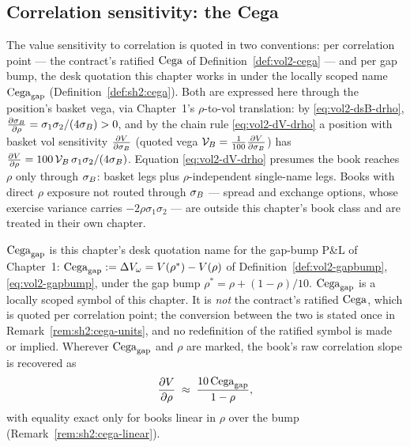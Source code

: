 \subsection{Correlation sensitivity: the Cega}\label{sec:sh2:cega}

The value sensitivity to correlation is quoted in two conventions: per
correlation point --- the contract's ratified $\mathrm{Cega}$ of
Definition~\ref{def:vol2-cega} --- and per gap bump, the desk quotation
this chapter works in under the locally scoped name $\mathrm{Cega}_{\mathrm{gap}}$
(Definition~\ref{def:sh2:cega}). Both are expressed here through the
position's basket vega, via Chapter~1's $\rho$-to-vol translation: by
\eqref{eq:vol2-dsB-drho}, $\frac{\partial \sigma_B}{\partial \rho} = \sigma_1\sigma_2/(4\sigma_B) > 0$,
and by the chain rule \eqref{eq:vol2-dV-drho} a position with basket vol
sensitivity $\frac{\partial V}{\partial \sigma_B}$ (quoted vega $\mathcal{V}_B = \tfrac1{100}\frac{\partial V}{\partial \sigma_B}$)
has $\frac{\partial V}{\partial \rho} = 100\,\mathcal{V}_B\,\sigma_1\sigma_2/(4\sigma_B)$.
Equation \eqref{eq:vol2-dV-drho} presumes the book reaches $\rho$ only
through $\sigma_B$: basket legs plus $\rho$-independent single-name legs. Books
with direct $\rho$ exposure not routed through $\sigma_B$ --- spread and
exchange options, whose exercise variance carries $-2\rho\sigma_1\sigma_2$
--- are outside this chapter's book class and are treated in their own
chapter.

\begin{definition}\label{def:sh2:cega}
$\mathrm{Cega}_{\mathrm{gap}}$ is this chapter's desk quotation name for the gap-bump P\&L of
Chapter~1: $\mathrm{Cega}_{\mathrm{gap}} := \Delta V_{\omega} = V(\rho^{*}) - V(\rho)$ of
Definition~\ref{def:vol2-gapbump}, \eqref{eq:vol2-gapbump}, under the gap
bump $\rho^{*} = \rho + (1 - \rho)/10$. $\mathrm{Cega}_{\mathrm{gap}}$ is a locally scoped
symbol of this chapter. It is \emph{not}
the contract's ratified $\mathrm{Cega}$, which is quoted per correlation point;
the conversion between the two is stated once in
Remark~\ref{rem:sh2:cega-units}, and no redefinition of the ratified
symbol is made or implied. Wherever $\mathrm{Cega}_{\mathrm{gap}}$ and $\rho$ are marked, the
book's raw correlation slope is recovered as
\begin{equation}\label{eq:sh2:dVdrho-from-cega}
  \frac{\partial V}{\partial \rho} \;\approx\; \frac{10\, \mathrm{Cega}_{\mathrm{gap}}}{1 - \rho},
\end{equation}
with equality exact only for books linear in $\rho$ over the bump
(Remark~\ref{rem:sh2:cega-linear}).
\end{definition}

